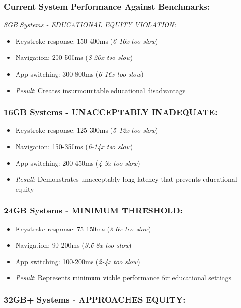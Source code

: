\subsubsection{Current System Performance Against Benchmarks:}

\emph{8GB Systems - EDUCATIONAL EQUITY VIOLATION:}

\begin{itemize}
\item Keystroke response: 150-400ms (\emph{6-16x too slow})
\item Navigation: 200-500ms (\emph{8-20x too slow})
\item App switching: 300-800ms (\emph{6-16x too slow})
\item \emph{Result}: Creates insurmountable educational disadvantage
\end{itemize}

\subsubsection{16GB Systems - UNACCEPTABLY INADEQUATE:}

\begin{itemize}
\item Keystroke response: 125-300ms (\emph{5-12x too slow})
\item Navigation: 150-350ms (\emph{6-14x too slow})
\item App switching: 200-450ms (\emph{4-9x too slow})
\item \emph{Result}: Demonstrates unacceptably long latency that prevents educational equity
\end{itemize}

\subsubsection{24GB Systems - MINIMUM THRESHOLD:}

\begin{itemize}
\item Keystroke response: 75-150ms (\emph{3-6x too slow})
\item Navigation: 90-200ms (\emph{3.6-8x too slow})
\item App switching: 100-200ms (\emph{2-4x too slow})
\item \emph{Result}: Represents minimum viable performance for educational settings
\end{itemize}

\subsubsection{32GB+ Systems - APPROACHES EQUITY:}

